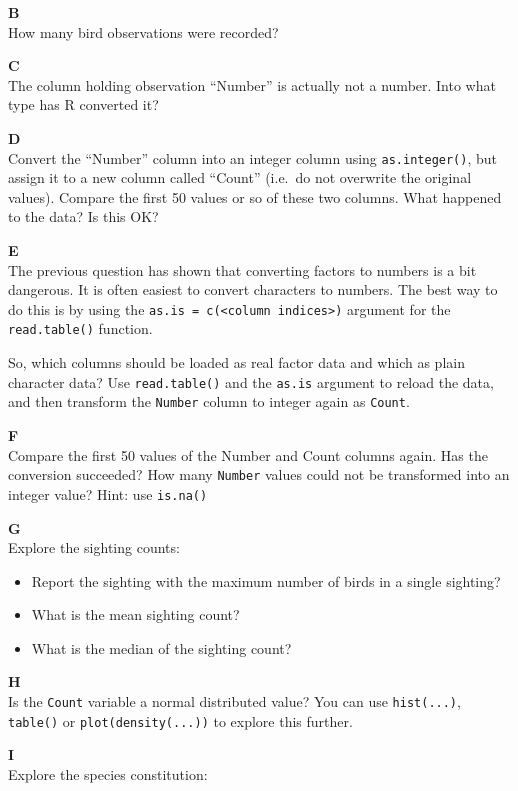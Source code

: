 \documentclass[]{book}
\providecommand{\tightlist}{%
  \setlength{\itemsep}{0pt}\setlength{\parskip}{0pt}}
\begin{document}
\textbf{B}\\
How many bird observations were recorded?

\textbf{C}\\
The column holding observation ``Number'' is actually not a number. Into what type has R converted it?

\textbf{D}\\
Convert the ``Number'' column into an integer column using \texttt{as.integer()}, but assign it to a new column called ``Count'' (i.e.~do not overwrite the original values). Compare the first 50 values or so of these two columns. What happened to the data? Is this OK?

\textbf{E}\\
The previous question has shown that converting factors to numbers is a bit dangerous. It is often easiest to convert characters to numbers. The best way to do this is by using the \texttt{as.is\ =\ c(\textless{}column\ indices\textgreater{})} argument for the \texttt{read.table()} function.

So, which columns should be loaded as real factor data and which as plain character data? Use \texttt{read.table()} and the \texttt{as.is} argument to reload the data, and then transform the \texttt{Number} column to integer again as \texttt{Count}.

\textbf{F}\\
Compare the first 50 values of the Number and Count columns again. Has the conversion succeeded? How many \texttt{Number} values could not be transformed into an integer value? Hint: use \texttt{is.na()}

\textbf{G}\\
Explore the sighting counts:

\begin{itemize}
\tightlist
\item
  Report the sighting with the maximum number of birds in a single sighting?
\item
  What is the mean sighting count?
\item
  What is the median of the sighting count?
\end{itemize}

\textbf{H}\\
Is the \texttt{Count} variable a normal distributed value? You can use \texttt{hist(...)}, \texttt{table()} or \texttt{plot(density(...))} to explore this further.

\textbf{I}\\
Explore the species constitution:
\end{document}
